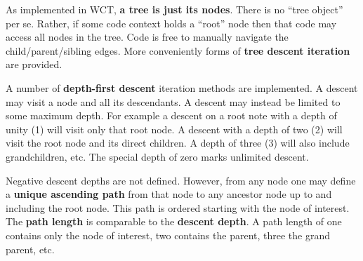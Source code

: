 \documentclass{article}
\begin{document}
\begin{center}
\end{center}

As implemented in WCT, \textbf{a tree is just its nodes}. 
There is no ``tree object'' per se. 
Rather, if some code context holds a ``root'' node then that code may access all nodes in the tree. 
Code is free to manually  navigate the child/parent/sibling edges. 
More conveniently forms of \textbf{tree descent iteration} are provided.  

A number of \textbf{depth-first descent} iteration methods are implemented.  A descent may visit a node and all its descendants.  A descent may instead be limited to some maximum depth.  For example a descent on a root note with a depth of unity (1) will visit only that root node.  A descent with a depth of two (2) will visit the root node and its direct children.  A depth of three (3) will also include grandchildren, etc.  The special depth of zero marks unlimited descent.

Negative descent depths are not defined.  However, from any node one may define a \textbf{unique ascending path} from that node to any ancestor node up to and including the root node.  This path is ordered starting with the node of interest.  The \textbf{path length} is comparable to the \textbf{descent depth}.  A path length of one contains only the node of interest, two contains the parent, three the grand parent, etc. 
\end{document}
